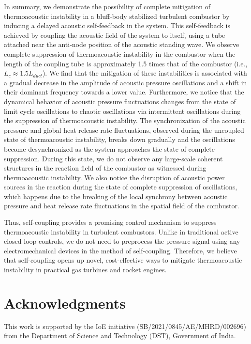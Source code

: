 \documentclass[%
preprint,
 amsmath,amssymb,
 aps,
 pra,
]{revtex4-2}
\begin{document}
In summary, we demonstrate the possibility of complete mitigation of thermoacoustic instability in a bluff-body stabilized turbulent combustor by inducing a delayed acoustic self-feedback in the system. This self-feedback is achieved by coupling the acoustic field of the system to itself, using a tube attached near the anti-node position of the acoustic standing wave. We observe complete suppression of thermoacoustic instability in the combustor when the length of the coupling tube is approximately 1.5 times that of the combustor (i.e., $L_c \approx 1.5L_{duct}$). We find that the mitigation of these instabilities is associated with a gradual decrease in the amplitude of acoustic pressure oscillations and a shift in their dominant frequency towards a lower value. Furthermore, we notice that the dynamical behavior of acoustic pressure fluctuations changes from the state of limit cycle oscillations to chaotic oscillations via intermittent oscillations during the suppression of thermoacoustic instability. The synchronization of the acoustic pressure and global heat release rate fluctuations, observed during the uncoupled state of thermoacoustic instability, breaks down gradually and the oscillations become desynchronized as the system approaches the state of complete suppression. During this state, we do not observe any large-scale coherent structures in the reaction field of the combustor as witnessed during thermoacoustic instability. We also notice the disruption of acoustic power sources in the reaction during the state of complete suppression of oscillations, which happens due to the breaking of the local synchrony between acoustic pressure and heat release rate fluctuations in the spatial field of the combustor. 

Thus, self-coupling provides a promising control mechanism to suppress thermoacoustic instability in turbulent combustors. Unlike in traditional active closed-loop controls, we do not need to preprocess the pressure signal using any electromechanical devices in the method of self-coupling. Therefore, we believe that self-coupling opens up novel, cost-effective ways to mitigate thermoacoustic instability in practical gas turbines and rocket engines. 

\section*{Acknowledgments}
This work is supported by the IoE initiative
(SB/2021/0845/AE/MHRD/002696) from the Department of Science and Technology (DST), Government of India.


\end{document}
